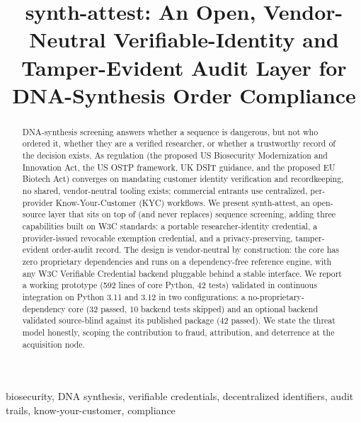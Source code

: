 \documentclass[conference]{IEEEtran}
\begin{document}
\title{synth-attest: An Open, Vendor-Neutral Verifiable-Identity and\\
Tamper-Evident Audit Layer for DNA-Synthesis Order Compliance}

\author{
}

\maketitle

\begin{abstract}
DNA-synthesis screening answers whether a sequence is dangerous, but not who ordered it,
whether they are a verified researcher, or whether a trustworthy record of the decision exists.
As regulation (the proposed US Biosecurity Modernization and Innovation Act, the US OSTP
framework, UK DSIT guidance, and the proposed EU Biotech Act) converges on mandating customer
identity verification and recordkeeping, no shared, vendor-neutral tooling exists; commercial
entrants use centralized, per-provider Know-Your-Customer (KYC) workflows. We present
synth-attest, an open-source layer that sits on top of (and never replaces) sequence screening,
adding three capabilities built on W3C standards: a portable researcher-identity credential, a
provider-issued revocable exemption credential, and a privacy-preserving, tamper-evident
order-audit record. The design is vendor-neutral by construction: the core has zero proprietary
dependencies and runs on a dependency-free reference engine, with any W3C Verifiable Credential
backend pluggable behind a stable interface. We report a working prototype (592 lines of core
Python, 42 tests) validated in continuous integration on Python 3.11 and 3.12 in two
configurations: a no-proprietary-dependency core (32 passed, 10 backend tests skipped) and an
optional backend validated source-blind against its published package (42 passed). We state the
threat model honestly, scoping the contribution to fraud, attribution, and deterrence at the
acquisition node.
\end{abstract}

\begin{IEEEkeywords}
biosecurity, DNA synthesis, verifiable credentials, decentralized identifiers, audit trails,
know-your-customer, compliance
\end{IEEEkeywords}
\end{document}
